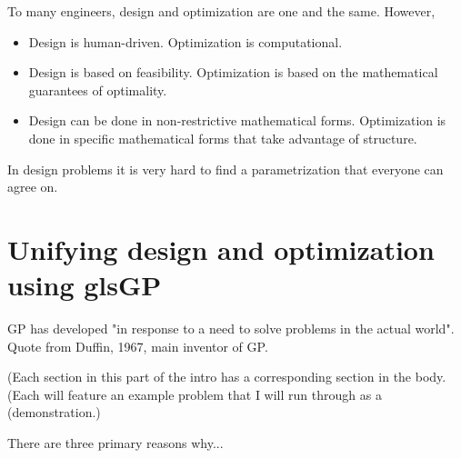 To many engineers, design and optimization are one and the same. However, 

\begin{itemize}
\item Design is human-driven. Optimization is computational. 
\item Design is based on feasibility. Optimization is based on the mathematical 
guarantees of optimality. 
\item Design can be done in non-restrictive mathematical forms. Optimization is 
done in specific mathematical forms that take advantage of structure. 
\end{itemize}

In design problems it is very hard to find a parametrization that 
everyone can agree on. 

\section{Unifying design and optimization using gls{GP}}

\gls{GP} has developed "in response to a need to solve problems in the actual 
world".~\cite{duffingp} Quote from Duffin, 1967, main inventor of GP.

(Each section in this part of the intro has a corresponding section in the body.
(Each will feature an example problem that I will run through as a
(demonstration.)

There are three primary reasons why...

